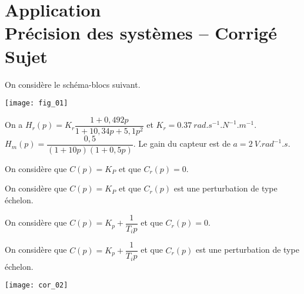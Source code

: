 \chapter*{Application  \\ 
Précision des systèmes -- \ifprof Corrigé \else Sujet \fi}


\iflivret {} \else
\ifprof  {} \else \fi
\fi
\setcounter{question}{0}




On considère le schéma-blocs suivant. 
\begin{center}
\texttt{[image: fig\_01]}
\end{center}


On a $H_r(p)=K_r \dfrac{1+0,492 p}{1+10,34p+5,1p^2}$ et $K_r = \SI{0,37}{rad.s^{-1}.N^{-1}.m^{-1}}$.
$H_m(p)=\dfrac{0,5}{\left(1+10p \right)\left(1+0,5p \right)}$. Le gain du capteur est de $a=\SI{2}{V.rad^{-1}.s}$.

{On considère que $C(p)=K_P$ et que $C_r(p)=0$.}



{On considère que $C(p)=K_P$ et que $C_r(p)$ est une perturbation de type échelon.}


{On considère que $C(p)=K_p+\dfrac{1}{T_i p} $ et que $C_r(p)=0$.}


On considère que $C(p)=K_p+\dfrac{1}{T_i p} $ et que $C_r(p)$ est une perturbation de type échelon.





\ifprof
\begin{center}
\texttt{[image: cor\_02]}
\end{center}

